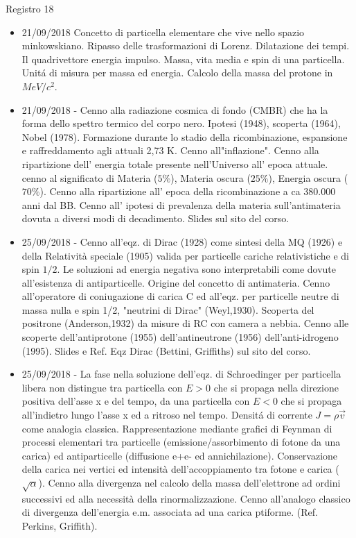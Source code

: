 \begin{frame}{Registro 18}
\begin{itemize}
\item 21/09/2018 Concetto di particella elementare che vive nello spazio minkowskiano. Ripasso delle trasformazioni di Lorenz. Dilatazione dei tempi. Il quadrivettore energia impulso. Massa, vita media e spin di una particella. Unit\'a di misura per massa ed energia. Calcolo della massa del protone in $MeV/c^2$.
\item 21/09/2018 - Cenno alla radiazione cosmica di fondo (CMBR) che ha la forma dello spettro termico del corpo nero. Ipotesi (1948), scoperta (1964), Nobel (1978). Formazione durante lo stadio della ricombinazione, espansione e raffreddamento agli attuali 2,73 K. Cenno all"inflazione". Cenno alla ripartizione dell' energia totale presente nell'Universo all' epoca attuale. cenno al significato di Materia ($5\%$), Materia oscura ($25\%$), Energia oscura ($70\%$). Cenno alla ripartizione all' epoca della ricombinazione a ca 380.000 anni dal BB. Cenno all' ipotesi di prevalenza della materia sull'antimateria dovuta a diversi modi di decadimento. Slides sul sito del corso.
\item 25/09/2018 - Cenno all'eqz. di Dirac (1928) come sintesi della MQ (1926) e della Relatività speciale (1905) valida per particelle cariche relativistiche e di spin $1/2$. Le soluzioni ad energia negativa sono interpretabili come dovute all'esistenza di antiparticelle. Origine del concetto di antimateria. Cenno all'operatore di coniugazione di carica C ed all'eqz. per particelle neutre di massa nulla e spin 1/2, "neutrini di Dirac" (Weyl,1930). Scoperta del positrone (Anderson,1932) da misure di RC con camera a nebbia. Cenno alle scoperte dell'antiprotone (1955) dell'antineutrone (1956) dell'anti-idrogeno (1995). Slides e Ref. Eqz Dirac (Bettini, Griffiths) sul sito del corso.
\item 25/09/2018 - La fase nella soluzione dell'eqz. di Schroedinger per particella libera non distingue tra particella con $E>0$ che si propaga nella direzione positiva dell'asse x e del tempo, da una particella con $E<0$ che si propaga all'indietro lungo l'asse x ed a ritroso nel tempo. Densit\'a di corrente $J=\rho\vec{v}$ come analogia classica. Rappresentazione mediante grafici di Feynman di processi elementari tra particelle (emissione/assorbimento di fotone da una carica) ed antiparticelle (diffusione e+e- ed annichilazione). Conservazione della carica nei vertici ed intensità dell'accoppiamento tra fotone e carica ($\sqrt{\alpha}$). Cenno alla divergenza nel calcolo della massa dell'elettrone ad ordini successivi ed alla necessità della rinormalizzazione. Cenno all'analogo classico di divergenza dell'energia e.m. associata ad una carica ptiforme. (Ref. Perkins, Griffith).

\end{itemize}
\end{frame}
